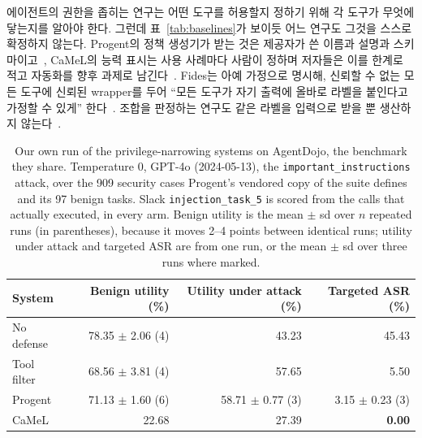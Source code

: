 \documentclass[acmsmall,screen,review,anonymous]{acmart}
\begin{document}
에이전트의 권한을 좁히는 연구는 어떤 도구를 허용할지 정하기 위해 각 도구가 무엇에 닿는지를 알아야 한다. 그런데 표~\ref{tab:baselines}가 보이듯 어느 연구도 그것을 스스로 확정하지 않는다. Progent의 정책 생성기가 받는 것은 제공자가 쓴 이름과 설명과 스키마이고~\cite{shi2025progent}, CaMeL의 능력 표시는 사용 사례마다 사람이 정하며 저자들은 이를 한계로 적고 자동화를 향후 과제로 남긴다~\cite{debenedetti2025defeating}. Fides는 아예 가정으로 명시해, 신뢰할 수 없는 모든 도구에 신뢰된 wrapper를 두어 ``모든 도구가 자기 출력에 올바로 라벨을 붙인다고 가정할 수 있게'' 한다~\cite{costa2025securing}. 조합을 판정하는 연구도 같은 라벨을 입력으로 받을 뿐 생산하지 않는다~\cite{beurerkellner2025toxicflow, schneider2026securing}.

\begin{table}[h]
\caption{Our own run of the privilege-narrowing systems on AgentDojo, the benchmark they share. Temperature 0, GPT-4o (2024-05-13), the \texttt{important\_instructions} attack, over the 909 security cases Progent's vendored copy of the suite defines and its 97 benign tasks. Slack \texttt{injection\_task\_5} is scored from the calls that actually executed, in every arm. Benign utility is the mean $\pm$ sd over $n$ repeated runs (in parentheses), because it moves 2--4 points between identical runs; utility under attack and targeted ASR are from one run, or the mean $\pm$ sd over three runs where marked.}
\label{tab:adrun}
\small
\begin{tabular}{lrrr}
\toprule
System & Benign utility (\%) & Utility under attack (\%) & Targeted ASR (\%) \\
\midrule
No defense                      & 78.35 $\pm$ 2.06 (4) & 43.23 & 45.43 \\
Tool filter~\cite{debenedetti2024agentdojo} & 68.56 $\pm$ 3.81 (4) & 57.65 & 5.50 \\
Progent~\cite{shi2025progent}   & 71.13 $\pm$ 1.60 (6) & 58.71 $\pm$ 0.77 (3) & 3.15 $\pm$ 0.23 (3) \\
CaMeL~\cite{debenedetti2025defeating} & 22.68 & 27.39 & \textbf{0.00} \\
\bottomrule
\end{tabular}
\end{table}
\end{document}
